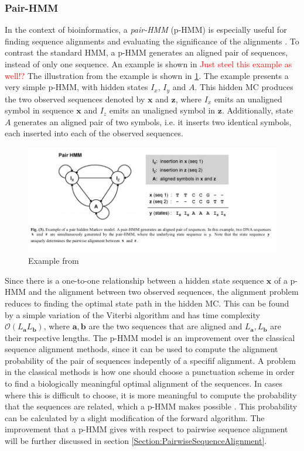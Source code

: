 \documentclass{article}
\begin{document}
\subsubsection{Pair-HMM}
In the context of bioinformatics, a \textit{pair-HMM} (p-HMM) is especially useful for finding sequence alignments and evaluating the significance of the alignments \cite{Yoon2009}. To contrast the standard HMM, a p-HMM generates an aligned pair of sequences, instead of only one sequence. An example is shown in \cite{Yoon2009} \textcolor{red}{Just steel this example as well!?} The illustration from the example is shown in \ref{fig:Yoon2009PairHMMExample}. The example presents a very simple p-HMM, with hidden states $I_x$, $I_y$ and $A$. This hidden MC produces the two observed sequences denoted by $\mathbf{x}$ and $\mathbf{z}$, where $I_x$ emits an unaligned symbol in sequence $\mathbf{x}$ and $I_z$ emits an unaligned symbol in $\mathbf{z}$. Additionally, state $A$ generates an aligned pair of two symbols, i.e. it inserts two identical symbols, each inserted into each of the observed sequences.  

\begin{figure}
    \centering
    \includegraphics[width = \textwidth]{examplePairHMMYoon.png}
    \caption{Example from \cite{Yoon2009}}
    \label{fig:Yoon2009PairHMMExample}
\end{figure}

Since there is a one-to-one relationship between a hidden state sequence $\mathbf{x}$ of a p-HMM and the alignment between two observed sequences, the alignment problem reduces to finding the optimal state path in the hidden MC. This can be found by a simple variation of the Viterbi algorithm and has time complexity $\mathcal{O}(L_\mathbf{a}L_\mathbf{b})$, where $\mathbf{a}, \mathbf{b}$ are the two sequences that are aligned and $L_\mathbf{a}, L_\mathbf{b}$ are their respective lengths. The p-HMM model is an improvement over the classical sequence alignment methods, since it can be used to compute the alignment probability of the pair of sequences indepently of a specifif alignment. A problem in the classical methods is how one should choose a punctuation scheme in order to find a biologically meaningful optimal alignment of the sequences. In cases where this is difficult to choose, it is more meaningful to compute the probability that the sequences are related, which a p-HMM makes possible \cite{Yoon2009}. This probability can be calculated by a slight modification of the forward algorithm. The improvement that a p-HMM gives with respect to pairwise sequence alignment will be further discussed in section \ref{Section:PairwiseSequenceAlignment}.
\end{document}
